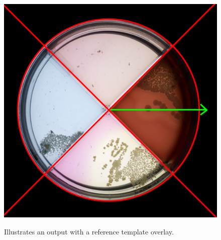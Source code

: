 \begin{figure}[H]
    \centering
    \includegraphics[width=0.5\linewidth]{figures/PDF/Evaluation_2.pdf}\\
    \caption{Illustrates an output with a reference template overlay.}
    \label{fig:method evaluation}
\end{figure}


